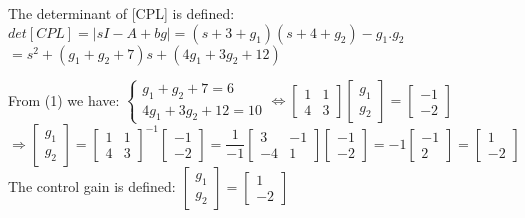 \documentclass[14pt,a4paper]{article}
\begin{document}
\begin{enumerate}
		The determinant of [CPL] is defined: \\
		$det[CPL] = |sI-A+bg| = (s+3+g_1)(s+4+g_2) - g_1.g_2$\\
		\hspace*{4.6cm} $ = s^2 + (g_1 + g_2 + 7)s + (4g_1+3g_2+12)  $ 
		
		From (1) we have:
		$\begin{cases} g_1 + g_2 + 7 = 6 \\	4g_1 + 3g_2 + 12 = 10	\end{cases} \Leftrightarrow \begin{bmatrix} 1&1 \\ 4&3\end{bmatrix} \begin{bmatrix} g_1\\g_2 \end{bmatrix} = \begin{bmatrix} -1\\-2 \end{bmatrix} $ \\[0.2cm]
		$ \Rightarrow \begin{bmatrix} g_1\\g_2 \end{bmatrix} = {\begin{bmatrix} 1&1 \\ 4&3\end{bmatrix}}^{-1} \begin{bmatrix} -1\\-2 \end{bmatrix} = \dfrac{1}{-1} \begin{bmatrix} 3&-1 \\ -4&1\end{bmatrix} \begin{bmatrix} -1\\-2 \end{bmatrix} = -1\begin{bmatrix} -1\\2 \end{bmatrix} = \begin{bmatrix} 1\\-2 \end{bmatrix}$ \\[0.2cm]
		The control gain is defined: $ \begin{bmatrix} g_1\\g_2 \end{bmatrix} = \begin{bmatrix} 1\\-2 \end{bmatrix}$ \\
		

\end{enumerate}
\end{document}
